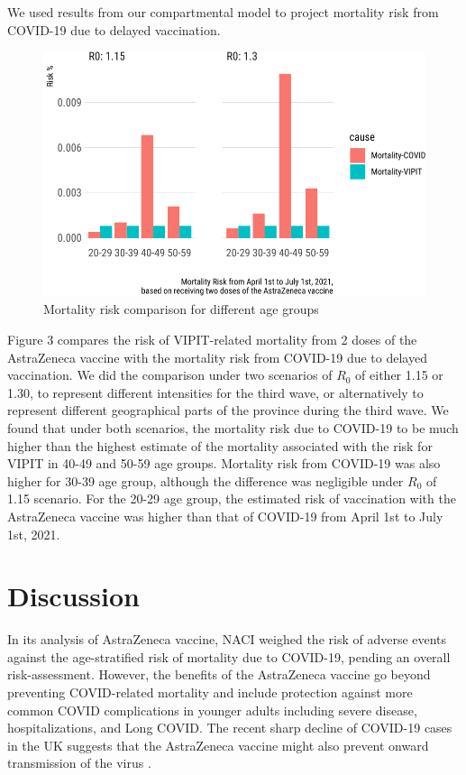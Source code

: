 \documentclass[]{interact}
\theoremstyle{plain}%
\theoremstyle{definition}
\theoremstyle{remark}
\begin{document}
We used results from our compartmental model to project mortality risk
from COVID-19 due to delayed vaccination.

\begin{figure}

{\centering \includegraphics[width=0.7\linewidth]{theCaseforAZ_files/figure-latex/covidvsvipit-1} 

}

\caption{Mortality risk comparison for different age groups}\label{fig:covidvsvipit}
\end{figure}

Figure 3 compares the risk of VIPIT-related mortality from 2 doses of
the AstraZeneca vaccine with the mortality risk from COVID-19 due to
delayed vaccination. We did the comparison under two scenarios of
\(R_0\) of either 1.15 or 1.30, to represent different intensities for
the third wave, or alternatively to represent different geographical
parts of the province during the third wave. We found that under both
scenarios, the mortality risk due to COVID-19 to be much higher than the
highest estimate of the mortality associated with the risk for VIPIT in
40-49 and 50-59 age groups. Mortality risk from COVID-19 was also higher
for 30-39 age group, although the difference was negligible under
\(R_0\) of 1.15 scenario. For the 20-29 age group, the estimated risk of
vaccination with the AstraZeneca vaccine was higher than that of
COVID-19 from April 1st to July 1st, 2021.

\hypertarget{discussion}{%
\section{Discussion}\label{discussion}}

In its analysis of AstraZeneca vaccine, NACI weighed the risk of adverse
events against the age-stratified risk of mortality due to COVID-19,
pending an overall risk-assessment. However, the benefits of the
AstraZeneca vaccine go beyond preventing COVID-related mortality and
include protection against more common COVID complications in younger
adults including severe disease, hospitalizations, and Long COVID. The
recent sharp decline of COVID-19 cases in the UK suggests that the
AstraZeneca vaccine might also prevent onward transmission of the virus
\citep{our_world_in_data_covid-19_2021}.
\end{document}
